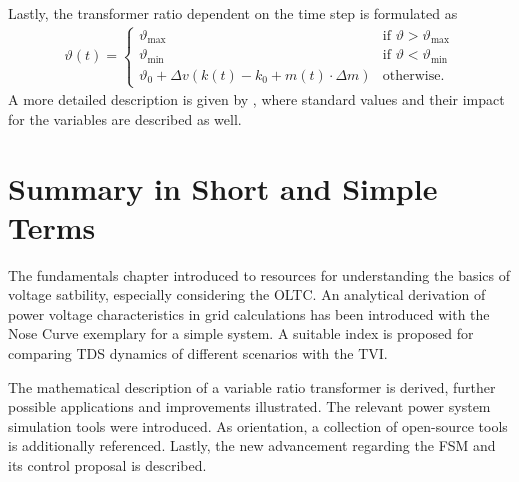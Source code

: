 Lastly, the transformer ratio dependent on the time step is formulated as 
\begin{align}
    \vartheta(t) = \begin{cases}
        \vartheta_\mathrm{max} & \text{if }\vartheta > \vartheta_\mathrm{max} \\
        \vartheta_\mathrm{min} & \text{if }\vartheta < \vartheta_\mathrm{min} \\
        \vartheta_0 + \Delta v (k(t)-k_0+m(t) \cdot \Delta m) & \text{otherwise.}
    \end{cases}\label{eq:fsm-control-transformer-ratio}
\end{align}
A more detailed description is given by \textcite{burlakin_2024}, where standard values and their impact for the variables are described as well.

\section{Summary in Short and Simple Terms}

The fundamentals chapter introduced to resources for understanding the basics of voltage satbility, especially considering the \acs{OLTC}.
An analytical derivation of power voltage characteristics in grid calculations has been introduced with the Nose Curve exemplary for a simple system.
A suitable index is proposed for comparing \ac{TDS} dynamics of different scenarios with the \acf{TVI}.

The mathematical description of a variable ratio transformer is derived, further possible applications and improvements illustrated.
The relevant power system simulation tools were introduced. 
As orientation, a collection of open-source tools is additionally referenced.
Lastly, the new advancement regarding the \acs{FSM} and its control proposal is described.